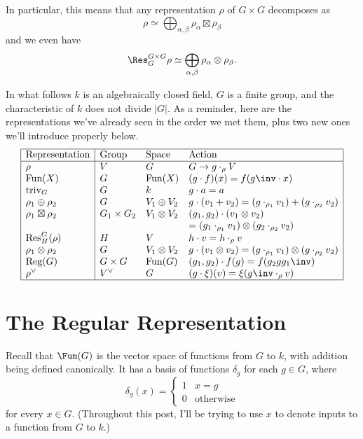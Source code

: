In particular, this means that any representation $\rho$ of $G \times G$ decomposes as
\[ \rho \simeq \bigoplus_{\alpha, \beta} \rho_\alpha \boxtimes \rho_\beta \]
and we even have
\[ \Res_{G}^{G\times G} \rho \simeq \bigoplus_{\alpha, \beta} \rho_\alpha \otimes \rho_\beta. \]


In what follows $k$ is an algebraically closed field, $G$ is a finite group, and the characteristic of $k$ does not divide $\left\lvert G \right\rvert$.
As a reminder, here are the representations we've already seen in the order we met them,
plus two new ones we'll introduce properly below.
\[
	\begin{array}{|l|lll|}
		\hline
		\text{Representation} & \text{Group} & \text{Space} & \text{Action} \\ \hline
		\rho & V & G & G \to g \cdot_\rho V \\
		\text{Fun}(X) & G & \text{Fun}(X) & (g \cdot f)(x) = f(g\inv \cdot x) \\
		\text{triv}_G & G & k & g \cdot a = a \\
		\rho_1 \oplus \rho_2 & G & V_1 \oplus V_2 & g \cdot (v_1 + v_2) = (g \cdot_{\rho_1} v_1) + (g \cdot_{\rho_2} v_2) \\
		\rho_1 \boxtimes \rho_2 & G_1 \times G_2 &  V_1 \otimes V_2 & (g_1, g_2) \cdot (v_1 \otimes v_2) \\
		&&& = (g_1 \cdot_{\rho_1} v_1) \otimes (g_2 \cdot_{\rho_2} v_2) \\
		\text{Res}^G_H(\rho) & H & V & h \cdot v = h \cdot_\rho v\\
		\rho_1 \otimes \rho_2 & G & V_1 \otimes V_2 & g \cdot (v_1 \otimes v_2) = (g \cdot_{\rho_1} v_1) \otimes (g \cdot_{\rho_2} v_2) \\
		\text{Reg}(G) & G \times G & \text{Fun}(G) & (g_1, g_2) \cdot f(g) = f(g_2 g g_1\inv) \\
		\rho^\vee & V^\vee & G & (g \cdot \xi)(v) = \xi(g\inv \cdot_\rho v) \\
		\hline
	\end{array}
\]

\section{The Regular Representation}
Recall that $\Fun(G)$ is the vector space of functions from $G$ to $k$, with addition being defined canonically.
It has a basis of functions $\delta_g$ for each $g \in G$, where
\[
	\delta_g(x)
	=
	\begin{cases}
		1 & x = g \\
		0 & \text{otherwise}
	\end{cases}
\]
for every $x \in G$. (Throughout this post, I'll be trying to use $x$ to denote inputs to a function from $G$ to $k$.)

